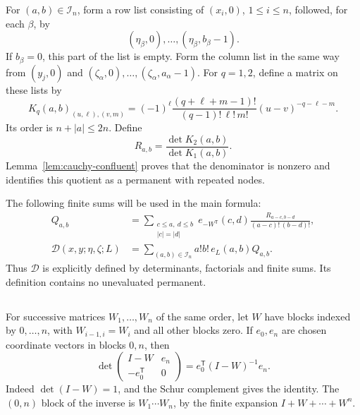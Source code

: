 \documentclass[11pt,reqno]{amsart}
\theoremstyle{remark}
\numberwithin{equation}{section}
\newcommand{\calI}{\mathcal I}
\newcommand{\calD}{\mathcal D}
\begin{document}
For $(a,b)\in\calI_n$, form a row list consisting of $(x_i,0)$,
$1\leq i\leq n$, followed, for each $\beta$, by
\[
 (\eta_\beta,0),\ldots,(\eta_\beta,b_\beta-1).
\]
If $b_\beta=0$, this part of the list is empty. Form the column list
in the same way from $(y_j,0)$ and
$(\zeta_\alpha,0),\ldots,(\zeta_\alpha,a_\alpha-1)$.
For $q=1,2$, define a matrix on these lists by
\begin{equation}\label{eq:cauchy-kdef}
 K_q(a,b)_{(u,\ell),(v,m)}
 =(-1)^\ell\frac{(q+\ell+m-1)!}{(q-1)!\,\ell!\,m!}
 (u-v)^{-q-\ell-m}.
\end{equation}
Its order is $n+|a|\leq2n$. Define
\begin{equation}\label{eq:cauchy-rdef}
 R_{a,b}=\frac{\det K_2(a,b)}{\det K_1(a,b)}.
\end{equation}
Lemma~\ref{lem:cauchy-confluent} proves that the denominator is nonzero and
identifies this quotient as a permanent with repeated nodes.

The following finite sums will be used in the main formula:
\begin{align}
 Q_{a,b}
 &=\sum_{\substack{c\leq a,\ d\leq b\\|c|=|d|}}
 e_{-W^{\mathsf T}}(c,d)
 \frac{R_{a-c,b-d}}{(a-c)!\,(b-d)!},\label{eq:cauchy-qcoef}\\
 \calD(x,y;\eta,\zeta;L)
 &=\sum_{(a,b)\in\calI_n}a!b!\,e_L(a,b)Q_{a,b}.
 \label{eq:cauchy-dformula}
\end{align}
Thus $\calD$ is explicitly defined by determinants, factorials and
finite sums. Its definition contains no unevaluated permanent.

\subsection{}

For successive matrices \(W_1,\ldots,W_n\) of the same order,
let \(W\) have blocks indexed by \(0,\ldots,n\), with
\(W_{i-1,i}=W_i\) and all other blocks zero. If \(e_0,e_n\)
are chosen coordinate vectors in blocks \(0,n\), then
\begin{equation}\label{eq:product-border}
 \det\begin{pmatrix}I-W&e_n\\-e_0^{\mathsf T}&0\end{pmatrix}
    = e_0^{\mathsf T}(I-W)^{-1}e_n.
\end{equation}
Indeed \(\det(I-W)=1\), and the Schur complement gives the
identity. The \((0,n)\) block of the inverse is \(W_1\cdots W_n\),
by the finite expansion \(I+W+\cdots+W^n\).
\end{document}
